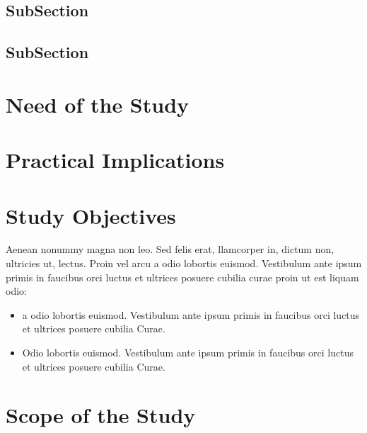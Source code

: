\subsection{SubSection}
\lipsum[4]


\subsection{SubSection}
\lipsum[1-3]


\section{Need of the Study}
\lipsum[7]


\section{Practical Implications}
\noindent  
\lipsum[2]


\section{Study Objectives} \label{objectives}
\noindent
Aenean nonummy magna non leo. Sed felis erat, llamcorper in, dictum non, ultricies ut, lectus. Proin vel arcu a odio lobortis euismod. Vestibulum ante
ipsum primis in faucibus orci luctus et ultrices posuere cubilia curae proin ut est liquam odio:

\begin{itemize}

  \item a odio lobortis euismod. Vestibulum ante
    ipsum primis in faucibus orci luctus et ultrices posuere cubilia Curae.
  
  \item Odio lobortis euismod. Vestibulum ante
    ipsum primis in faucibus orci luctus et ultrices posuere cubilia Curae. 

\end{itemize}



\section{Scope of the Study}
\lipsum[15] 


